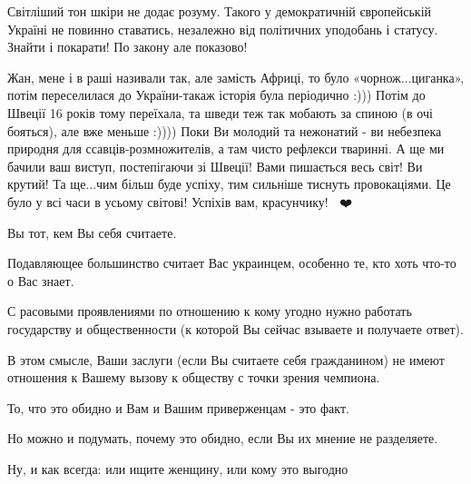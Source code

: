 \begin{itemize}
Світліший тон шкіри не додає розуму. Такого у демократичній європейській
Україні не повинно ставатись, незалежно від політичних уподобань і статусу.
Знайти і покарати! По закону але показово!

 

Жан, мене і в раші називали так, але замість Африці, то було
«чорнож...циганка», потім переселилася до України-такаж історія була періодично
:))) Потім до Швеції 16 років тому переїхала, та шведи теж так мобають за
спиною (в очі бояться), але вже меньше :)))) Поки Ви молодий та нежонатий - ви
небезпека природня для ссавців-розмножителів, а там чисто рефлекси тваринні. А
ще ми бачили ваш виступ, постепігаючи зі Швеції! Вами пишається весь світ! Ви
крутий! Та ще...чим більш буде успіху, тим сильніше тиснуть провокаціями. Це
було у всі часи в усьому світові! Успіхів вам, красунчику! 🙏🏻❤️


 

Вы тот, кем Вы себя считаете.

Подавляющее большинство считает Вас украинцем, особенно те, кто хоть что-то о
Вас знает.

С расовыми проявлениями по отношению к кому угодно нужно работать государству и
общественности (к которой Вы сейчас взываете и получаете ответ).

В этом смысле, Ваши заслуги (если Вы считаете себя гражданином) не имеют
отношения к Вашему вызову к обществу с точки зрения чемпиона.

То, что это обидно и Вам и Вашим приверженцам - это факт.

Но можно и подумать, почему это обидно, если Вы их мнение не разделяете.

Ну, и как всегда: или ищите женщину, или кому это выгодно \Smiley[1.0][yellow]


\end{itemize}

